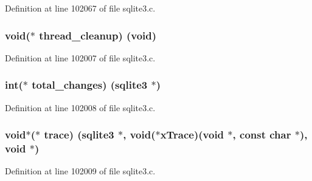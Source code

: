 Definition at line 102067 of file sqlite3.\+c.

\hypertarget{structsqlite3__api__routines_ab7f7f471e9b8dc39c4a63f0eb49425f8}{}
\subsubsection[{thread\+\_\+cleanup}]{\setlength{\rightskip}{0pt plus 5cm}void($\ast$ thread\+\_\+cleanup) (void)}\label{structsqlite3__api__routines_ab7f7f471e9b8dc39c4a63f0eb49425f8}


Definition at line 102007 of file sqlite3.\+c.

\hypertarget{structsqlite3__api__routines_a407aeda4a00461c7fcb2c91b92f173eb}{}
\subsubsection[{total\+\_\+changes}]{\setlength{\rightskip}{0pt plus 5cm}int($\ast$ total\+\_\+changes) ({\bf sqlite3} $\ast$)}\label{structsqlite3__api__routines_a407aeda4a00461c7fcb2c91b92f173eb}


Definition at line 102008 of file sqlite3.\+c.

\hypertarget{structsqlite3__api__routines_af9d9e1f7f5e00bbecbfa5c23138c4154}{}
\subsubsection[{trace}]{\setlength{\rightskip}{0pt plus 5cm}void$\ast$($\ast$ trace) ({\bf sqlite3} $\ast$, void($\ast$x\+Trace)(void $\ast$, const char $\ast$), void $\ast$)}\label{structsqlite3__api__routines_af9d9e1f7f5e00bbecbfa5c23138c4154}


Definition at line 102009 of file sqlite3.\+c.

\hypertarget{structsqlite3__api__routines_a848b170b255643a1b3eda56a56da0eb7}{}
